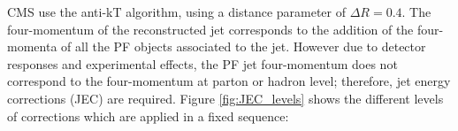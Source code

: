
CMS use the anti-kT algorithm, using a distance parameter of $\Delta R = 0.4$. The four-momentum 
of the reconstructed jet corresponds to the addition of the four-momenta of all the PF objects associated to the jet. 
However due to detector responses and experimental effects, the PF jet four-momentum does not correspond to the four-momentum
at parton or hadron level; therefore, jet energy corrections (JEC) are required. Figure \ref{fig:JEC_levels} shows the different
levels of corrections which are applied in a fixed sequence:

